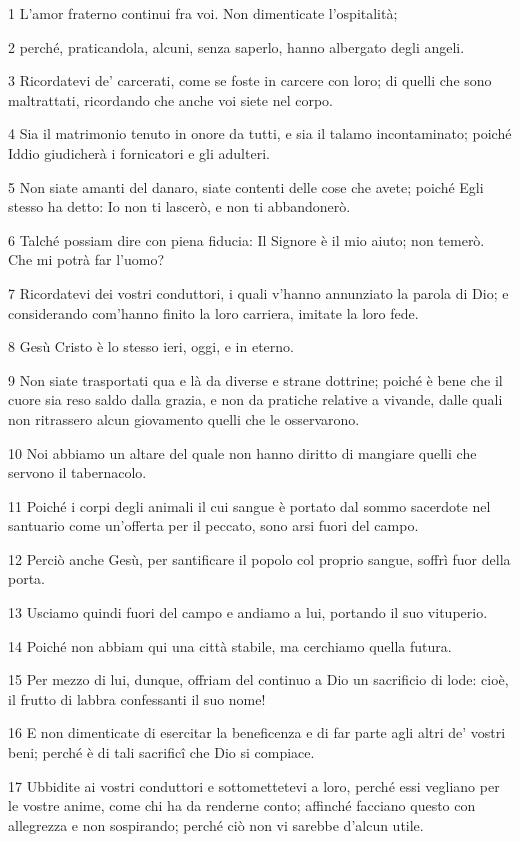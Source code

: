 \par 1 L'amor fraterno continui fra voi. Non dimenticate l'ospitalità;
\par 2 perché, praticandola, alcuni, senza saperlo, hanno albergato degli angeli.
\par 3 Ricordatevi de' carcerati, come se foste in carcere con loro; di quelli che sono maltrattati, ricordando che anche voi siete nel corpo.
\par 4 Sia il matrimonio tenuto in onore da tutti, e sia il talamo incontaminato; poiché Iddio giudicherà i fornicatori e gli adulteri.
\par 5 Non siate amanti del danaro, siate contenti delle cose che avete; poiché Egli stesso ha detto: Io non ti lascerò, e non ti abbandonerò.
\par 6 Talché possiam dire con piena fiducia: Il Signore è il mio aiuto; non temerò. Che mi potrà far l'uomo?
\par 7 Ricordatevi dei vostri conduttori, i quali v'hanno annunziato la parola di Dio; e considerando com'hanno finito la loro carriera, imitate la loro fede.
\par 8 Gesù Cristo è lo stesso ieri, oggi, e in eterno.
\par 9 Non siate trasportati qua e là da diverse e strane dottrine; poiché è bene che il cuore sia reso saldo dalla grazia, e non da pratiche relative a vivande, dalle quali non ritrassero alcun giovamento quelli che le osservarono.
\par 10 Noi abbiamo un altare del quale non hanno diritto di mangiare quelli che servono il tabernacolo.
\par 11 Poiché i corpi degli animali il cui sangue è portato dal sommo sacerdote nel santuario come un'offerta per il peccato, sono arsi fuori del campo.
\par 12 Perciò anche Gesù, per santificare il popolo col proprio sangue, soffrì fuor della porta.
\par 13 Usciamo quindi fuori del campo e andiamo a lui, portando il suo vituperio.
\par 14 Poiché non abbiam qui una città stabile, ma cerchiamo quella futura.
\par 15 Per mezzo di lui, dunque, offriam del continuo a Dio un sacrificio di lode: cioè, il frutto di labbra confessanti il suo nome!
\par 16 E non dimenticate di esercitar la beneficenza e di far parte agli altri de' vostri beni; perché è di tali sacrificî che Dio si compiace.
\par 17 Ubbidite ai vostri conduttori e sottomettetevi a loro, perché essi vegliano per le vostre anime, come chi ha da renderne conto; affinché facciano questo con allegrezza e non sospirando; perché ciò non vi sarebbe d'alcun utile.
